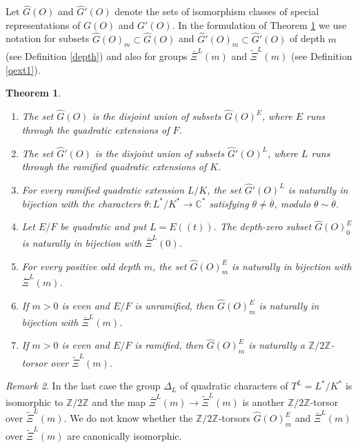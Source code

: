 \documentclass[11pt,a4paper,twoside]{amsart}
\newtheorem{theorem}{Theorem}[section]
\theoremstyle{definition}
\theoremstyle{remark}
\newtheorem{remark}[theorem]{Remark}
\newcommand{\D}{\Delta}
\newcommand{\CC}{\mathbb C}
\newcommand{\ZZ}{\mathbb Z}
\newcommand{\ti}{\widetilde}
\newcommand{\otheta}{\overline{\theta}}
\begin{document}
Let $\widehat G(O)$ and $\widehat G'(O)$ denote the sets of isomorphism classes of special representations of $G(O)$ and $G'(O)$. In the formulation of Theorem \ref{L} we use notation for subsets  $\widehat G(O)_m \subset \widehat G(O) $ and $ \widehat G'(O)_m \subset \widehat G'(O)$  of depth $m$ (see Definition \ref{depth}) and also  for groups $\bar\Xi^L(m)$ and $\ti\Xi^L(m)$ (see Definition \ref{qext1}). 

\begin{theorem}\label{L}
\begin{enumerate}
\item The set $\widehat G(O)$ is the disjoint union of subsets $\widehat G(O)^E$, where $E$ runs through the quadratic extensions of $F$.
\item The set $\widehat G'(O)$ is the disjoint union of subsets $\widehat G'(O)^L$, where $L$ runs through the ramified quadratic extensions of $K$.
\item For every ramified quadratic extension $L/K$, the set $\widehat G'(O)^L$ is naturally in bijection with the characters $\theta:L^*/K^*\to\CC^*$ satisfying $\theta\neq\otheta$, modulo $\theta\sim\otheta$.
\item Let $E/F$ be quadratic and put $L=E((t))$. The depth-zero subset $\widehat G(O)^E_0$ is naturally in bijection with $\bar\Xi^L(0)$.
\item For every positive odd depth $m$, the set $\widehat G(O)^E_m$ is naturally in bijection with $\bar\Xi^L(m)$.
\item If $m>0$ is even and $E/F$ is unramified, then $\widehat G(O)^E_m$ is naturally in bijection with
 $\bar\Xi^L(m)$.
\item If $m>0$ is even and $E/F$ is ramified, then
 $\widehat G(O)^E_m$ is naturally a $\ZZ/2\ZZ$-torsor over $\ti\Xi^L(m)$. 
\end{enumerate}
\end{theorem}
\begin{remark}
In the last case the group  $\D _L $ of quadratic characters of $T^L=L^*/K^*$ is isomorphic to $\ZZ/2\ZZ$ and the map $\bar\Xi^L(m)\to\ti\Xi^L(m)$ is another
 $\ZZ/2\ZZ$-torsor over $\ti\Xi^L(m)$. We do not know whether the  $\ZZ/2\ZZ$-torsors 
 $\widehat G(O)^E_m$ and $ \bar\Xi^L(m) $ over $ \ti\Xi^L(m) $ are canonically isomorphic.
\end{remark}
\end{document}
